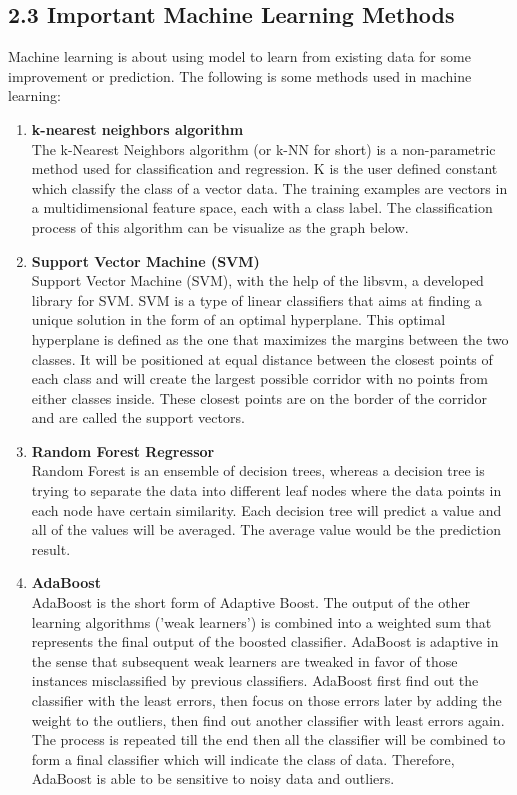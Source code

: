 \documentclass{article}
\begin{document}
	\subsection{2.3 Important Machine Learning Methods}
	Machine learning is about using model to learn from existing data for some improvement or prediction. 
	The following is some methods used in machine learning:
	\begin{enumerate}
		\item \textbf{k-nearest neighbors algorithm} \\
		The k-Nearest Neighbors algorithm (or k-NN for short) is a non-parametric method used for classification and regression. 
		K is the user defined constant which classify the class of a vector data. The training examples are vectors in a multidimensional feature space, 
		each with a class label. The classification process of this algorithm can be visualize as the graph below.
	
		\item \textbf{Support Vector Machine (SVM)} \\
		Support Vector Machine (SVM), with the help of the libsvm, a developed library for SVM. 
		SVM is a type of linear classiﬁers that aims at ﬁnding a unique solution in the form of an optimal hyperplane. 
		This optimal hyperplane is deﬁned as the one that maximizes the margins between the two classes. 
		It will be positioned at equal distance between the closest points of each class and will create the largest possible corridor with no points 
		from either classes inside. These closest points are on the border of the corridor and are called the support vectors.
	
		\item \textbf{Random Forest Regressor} \\
		Random Forest is an ensemble of decision trees, whereas a decision tree is trying to separate the data into different
		leaf nodes where the data points in each node have certain similarity. Each decision tree will predict a value and all of the values 
		will be averaged. The average value would be the prediction result.
	
		\item \textbf{AdaBoost} \\
		AdaBoost is the short form of Adaptive Boost. The output of the other learning algorithms ('weak learners') is combined 
		into a weighted sum that represents the final output of the boosted classifier. AdaBoost is adaptive in the sense that subsequent weak 
		learners are tweaked in favor of those instances misclassified by previous classifiers. AdaBoost first find out the classifier with the least errors, 
		then focus on those errors later by adding the weight to the outliers, then find out another classifier with least errors again. 
		The process is repeated till the end then all the classifier will be combined to form a final classifier which will indicate the class of data. 
		Therefore, AdaBoost is able to be sensitive to noisy data and outliers.
	

\end{enumerate}
\end{document}
